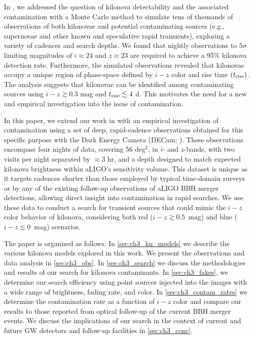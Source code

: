 In \citet[hereafter CB15]{CowpBerger15}, we addressed the question of kilonova detectability and the associated contamination with a Monte Carlo method to simulate tens of thousands of observations of both kilonovae and potential contaminating sources (e.g., supernovae and other known and speculative rapid transients), exploring a variety of cadences and search depths. We found that nightly observations to $5\sigma$ limiting magnitudes of $i \approx 24$ and $z \approx 23$ are required to achieve a 95\% kilonova detection rate. Furthermore, the simulated observations revealed that kilonovae occupy a unique region of phase-space defined by $i-z$ color and rise time $(t_{\rm rise})$. The analysis suggests that kilonovae can be identified among contaminating sources using $i-z\gtrsim 0.3$ mag and $t_{\rm rise}\lesssim 4$ d. This motivates the need for a new and empirical investigation into the issue of contamination.

In this paper, we extend our work in  with an empirical investigation of contamination using a set of deep, rapid-cadence observations obtained for this specific purpose with the Dark Energy Camera (DECam; \citealt{Flaugher+15}). These observations encompass four nights of data, covering 56 deg$^2$, in $i$- and $z$-bands, with two visits per night separated by $\approx 3$ hr, and a depth designed to match expected kilonova brightness within aLIGO's sensitivity volume. This dataset is unique as it targets cadences shorter than those employed by typical time-domain surveys or by any of the existing follow-up observations of aLIGO BBH merger detections, allowing direct insight into contamination in rapid searches. We use these data to conduct a search for transient sources that could mimic the $i-z$ color behavior of kilonova, considering both red ($i-z \gtrsim 0.5$~mag) and blue ($i-z \lesssim 0$~mag) scenarios.

\clearpage
The paper is organized as follows. In \cref{sec:ch3_kn_models} we describe the various kilonova models explored in this work. We present the observations and data analysis in \cref{sec:ch3_obs}. In \cref{sec:ch3_search} we discuss the methodologies and results of our search for kilonova contaminants. In \cref{sec:ch3_fakes}, we determine our search efficiency using point sources injected into the images with a wide range of brightness, fading rate, and color. In \cref{sec:ch3_contam_rates} we determine the contamination rate as a function of $i-z$ color and compare our results to those reported from optical follow-up of the current BBH merger events. We discuss the implications of our search in the context of current and future GW detectors and follow-up facilities in \cref{sec:ch3_conc}.


